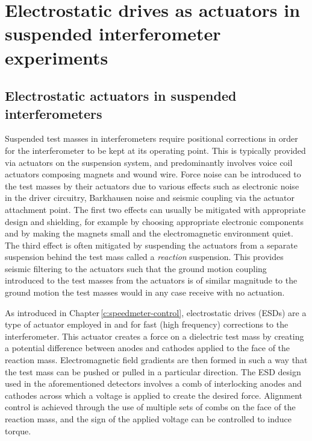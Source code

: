 \section{Electrostatic drives as actuators in suspended interferometer experiments}

\subsection{Electrostatic actuators in suspended interferometers}
Suspended test masses in interferometers require positional corrections in order for the interferometer to be kept at its operating point. This is typically provided via actuators on the suspension system, and predominantly involves voice coil actuators composing magnets and wound wire. Force noise can be introduced to the test masses by their actuators due to various effects such as electronic noise in the driver circuitry, Barkhausen noise \cite{Weiss2008} and seismic coupling via the actuator attachment point. The first two effects can usually be mitigated with appropriate design and shielding, for example by choosing appropriate electronic components and by making the magnets small and the electromagnetic environment quiet. The third effect is often mitigated by suspending the actuators from a separate suspension behind the test mass called a \emph{reaction} suspension. This provides seismic filtering to the actuators such that the ground motion coupling introduced to the test masses from the actuators is of similar magnitude to the ground motion the test masses would in any case receive with no actuation.

As introduced in Chapter\,\ref{c:speedmeter-control}, electrostatic drives (\glspl{ESD}) are a type of actuator employed in \GEO{} and \ALIGO{} for fast (high frequency) corrections to the interferometer. This actuator creates a force on a dielectric test mass by creating a potential difference between anodes and cathodes applied to the face of the reaction mass. Electromagnetic field gradients are then formed in such a way that the test mass can be pushed or pulled in a particular direction. The \gls{ESD} design used in the aforementioned detectors involves a comb of interlocking anodes and cathodes across which a voltage is applied to create the desired force. Alignment control is achieved through the use of multiple sets of combs on the face of the reaction mass, and the sign of the applied voltage can be controlled to induce torque.

